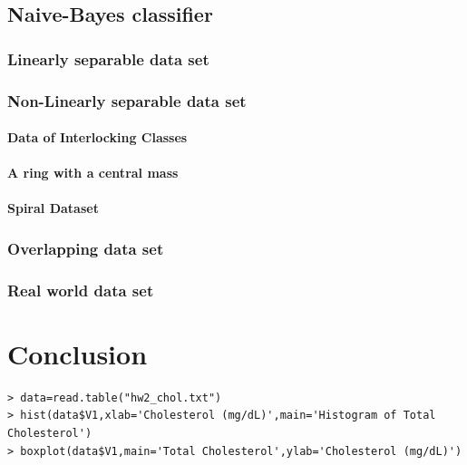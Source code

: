 \documentclass[a4paper]{article}
\begin{document}
	\subsection{Naive-Bayes classifier}
		\subsubsection{Linearly separable data set}
		\subsubsection{Non-Linearly separable data set }
			\paragraph{Data of Interlocking Classes}
			\paragraph{A ring with a central mass}
			\paragraph{Spiral Dataset}
		\subsubsection{Overlapping data set}
		\subsubsection{Real world data set}
\section{Conclusion}

\begin{verbatim}
> data=read.table("hw2_chol.txt")
> hist(data$V1,xlab='Cholesterol (mg/dL)',main='Histogram of Total Cholesterol')
> boxplot(data$V1,main='Total Cholesterol',ylab='Cholesterol (mg/dL)')
\end{verbatim}
\end{document}
